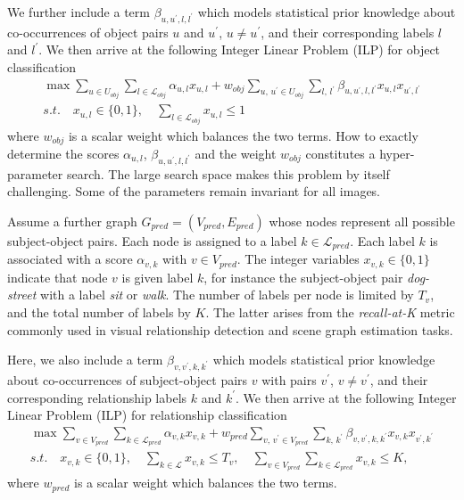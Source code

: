 \documentclass[runningheads]{llncs}
\newcommand{\cL}{\mathcal{L}}
\begin{document}
We further include a term $\beta_{u,u^\prime,l,l^\prime}$ which models statistical prior knowledge about co-occurrences of object pairs $u$ and $u^\prime$, $u \neq u^\prime$, and their corresponding labels $l$ and $l^\prime$. We then arrive at the following Integer Linear Problem (ILP) for object classification
\begin{subequations}
\begin{gather}
    \max \sum \limits_{u \in U_{obj}} \sum \limits_{l \in \cL_{obj}} \alpha_{u,l} x_{u,l} + w_{obj} \sum \limits_{u,\, u^\prime \in U_{obj}} \sum \limits_{l,\, l^\prime} \beta_{u,u^\prime,l,l^\prime} x_{u,l} x_{u^\prime,l^\prime} \\
    s.t. \quad x_{u,l} \in \{0,1\}, \quad \sum \limits_{l \in \cL_{obj}} x_{u,l} \leq 1
\end{gather}
\label{Eq:ILP.obj}
\end{subequations}
where $w_{obj}$ is a scalar weight which balances the two terms. How to exactly determine the scores $\alpha_{u,l}$, $\beta_{u,u^\prime,l,l^\prime}$ and the weight $w_{obj}$ constitutes a hyper-parameter search. The large search space makes this problem by itself challenging. Some of the parameters remain invariant for all images.

Assume a further graph $G_{pred}=(V_{pred},E_{pred})$ whose nodes represent all possible subject-object pairs. Each node is assigned to a label $k \in \cL_{pred}$. Each label $k$ is associated with a score $\alpha_{v,k}$ with $v \in V_{pred}$. The integer variables $x_{v,k} \in \{0,1\}$ indicate that node $v$ is given label $k$, for instance the subject-object pair \emph{dog-street} with a label \emph{sit} or \emph{walk}. The number of labels per node is limited by $T_v$, and the total number of labels by $K$. The latter arises from the \emph{recall-at-K} metric commonly used in visual relationship detection and scene graph estimation tasks. 

Here, we also include a term $\beta_{v,v^\prime,k,k^\prime}$ which models statistical prior knowledge about co-occurrences of subject-object pairs $v$ with pairs $v^\prime$, $v \neq v^\prime$, and their corresponding relationship labels $k$ and $k^\prime$. We then arrive at the following Integer Linear Problem (ILP) for relationship classification
\begin{subequations}
\begin{gather}
    \max \sum \limits_{v \in V_{pred}} \sum \limits_{k \in \cL_{pred}} \alpha_{v,k} x_{v,k} + w_{pred} \sum \limits_{v,\, v^\prime \in V_{pred}} \sum \limits_{k,\, k^\prime} \beta_{v,v^\prime,k,k^\prime} x_{v,k} x_{v^\prime,k^\prime} \\
    s.t. \quad x_{v,k} \in \{0,1\}, \quad \sum \limits_{k \in \cL} x_{v,k} \leq T_v, \quad 
    \sum \limits_{v \in V_{pred}} \sum \limits_{k \in \cL_{pred}} x_{v,k} \leq K,
\end{gather}
\label{Eq:ILP.pred}
\end{subequations}
where $w_{pred}$ is a scalar weight which balances the two terms. 
\end{document}
